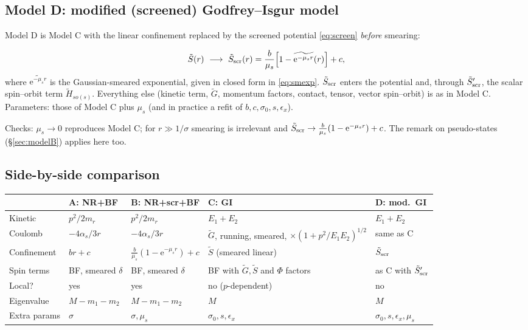 \documentclass[11pt,a4paper]{article}
\numberwithin{equation}{section}
\theoremstyle{definition}
\theoremstyle{plain}
\theoremstyle{remark}
\newenvironment{keyresult}[1][Key result]{\begin{tcolorbox}[keybox,title={\small\bfseries #1},fonttitle=\small,coltitle=white,colbacktitle=MidnightBlue!70]}{\end{tcolorbox}}
\numberwithin{algorithm}{section}
\newcommand{\as}{\alpha_s}
\newcommand{\ee}{\mathrm{e}}
\newcommand{\mr}{m_r}
\newcommand{\mus}{\mu_s}
\begin{document}
\subsection{Model D: modified (screened) Godfrey--Isgur model}\label{sec:modelD}
Model D is Model C with the linear confinement replaced by the screened potential \eqref{eq:screen} \emph{before} smearing:
\begin{keyresult}[Model D]
\begin{equation}
\tilde S(r)\ \longrightarrow\ \tilde S_{\rm scr}(r)=\frac{b}{\mus}\Big[1-\widetilde{\ee^{-\mus r}}(r)\Big]+c,
\end{equation}
where $\widetilde{\ee^{-\mus r}}$ is the Gaussian-smeared exponential, given in closed form in \eqref{eq:smexp}. $\tilde S_{\rm scr}$ enters the potential and, through $\tilde S_{\rm scr}'$, the scalar spin--orbit term $\tilde H_{so(s)}$. Everything else (kinetic term, $\tilde G$, momentum factors, contact, tensor, vector spin--orbit) is as in Model C.
Parameters: those of Model C plus $\mus$ (and in practice a refit of $b,c,\sigma_0,s,\epsilon_x$).
\end{keyresult}
Checks: $\mus\to0$ reproduces Model C; for $r\gg1/\sigma$ smearing is irrelevant and $\tilde S_{\rm scr}\to\frac b{\mus}(1-\ee^{-\mus r})+c$. The remark on pseudo-states (\S\ref{sec:modelB}) applies here too.

\subsection{Side-by-side comparison}
\begin{center}\small
\begin{tabular}{@{}p{2.3cm}p{2.9cm}p{2.9cm}p{3.2cm}p{3.2cm}@{}}
\toprule
 & A: NR+BF & B: NR+scr+BF & C: GI & D: mod.\ GI\\\midrule
Kinetic & $p^2/2\mr$ & $p^2/2\mr$ & $E_1+E_2$ & $E_1+E_2$\\
Coulomb & $-4\as/3r$ & $-4\as/3r$ & $\tilde G$, running, smeared, $\times(1+p^2/E_1E_2)^{1/2}$ & same as C\\
Confinement & $br+c$ & $\frac b{\mus}(1-\ee^{-\mus r})+c$ & $\tilde S$ (smeared linear) & $\tilde S_{\rm scr}$\\
Spin terms & BF, smeared $\delta$ & BF, smeared $\delta$ & BF with $\tilde G,\tilde S$ and $\Phi$ factors & as C with $\tilde S_{\rm scr}'$\\
Local? & yes & yes & no ($p$-dependent) & no\\
Eigenvalue & $M-m_1-m_2$ & $M-m_1-m_2$ & $M$ & $M$\\
Extra params & $\sigma$ & $\sigma,\mus$ & $\sigma_0,s,\epsilon_x$ & $\sigma_0,s,\epsilon_x,\mus$\\\bottomrule
\end{tabular}
\end{center}
\end{document}
